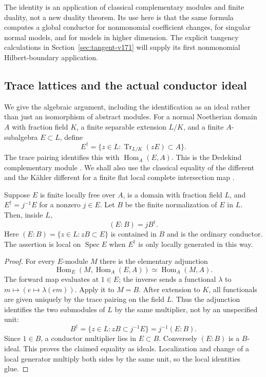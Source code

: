 The identity is an application of classical complementary modules and
finite duality, not a new duality theorem. Its use here is that the same
formula computes a global conductor for nonmonomial coefficient changes,
for singular normal models, and for models in higher dimension. The
explicit tangency calculations in Section~\ref{sec:tangent-v171} will
supply its first nonmonomial Hilbert-boundary application.

\subsection{Trace lattices and the actual conductor ideal}
We give the algebraic argument, including the identification as an ideal
rather than just an isomorphism of abstract modules. For a normal
Noetherian domain $A$ with fraction field $K$, a finite separable
extension $L/K$, and a finite $A$-subalgebra $E\subset L$, define
\[
 E^\dagger=\{z\in L:\operatorname{Tr}_{L/K}(zE)\subset A\}.
\]
The trace pairing identifies this with $\operatorname{Hom}_A(E,A)$.
This is the Dedekind complementary module
\cite[Section 49.8]{Stacks171}. We shall also use the classical equality
of the different and the K\"ahler different for a finite flat local
complete intersection map \cite[Section 49.12]{Stacks171}.

\begin{lemma}\label{lem:trace-lattice-v171}
Suppose $E$ is finite locally free over $A$, is a domain with fraction
field $L$, and $E^\dagger=j^{-1}E$ for a nonzero $j\in E$.
Let $B$ be the finite normalization of $E$ in $L$. Then, inside $L$,
\begin{equation}\label{eq:trace-conductor-v171}
 (E:B)=jB^\dagger.
\end{equation}
Here $(E:B)=\{z\in L:zB\subset E\}$ is contained in $B$ and is the
ordinary conductor. The assertion is local on $\operatorname{Spec}E$
when $E^\dagger$ is only locally generated in this way.
\end{lemma}
\begin{proof}
For every $E$-module $M$ there is the elementary adjunction
\[
 \operatorname{Hom}_E(M,\operatorname{Hom}_A(E,A))
 \simeq\operatorname{Hom}_A(M,A).
\]
The forward map evaluates at $1\in E$; the inverse sends a functional
$\lambda$ to $m\mapsto(e\mapsto\lambda(em))$. Apply it to $M=B$.
After extension to $K$, all functionals are given uniquely by the trace
pairing on the field $L$. Thus the adjunction identifies the two
submodules of $L$ by the same multiplier, not by an unspecified unit:
\[
 B^\dagger
 =\{z\in L:zB\subset j^{-1}E\}
 =j^{-1}(E:B).
\]
Since $1\in B$, a conductor multiplier lies in $E\subset B$. Conversely
$(E:B)$ is a $B$-ideal. This proves the claimed equality as ideals.
Localization and change of a local generator multiply both sides by
the same unit, so the local identities glue.
\end{proof}

